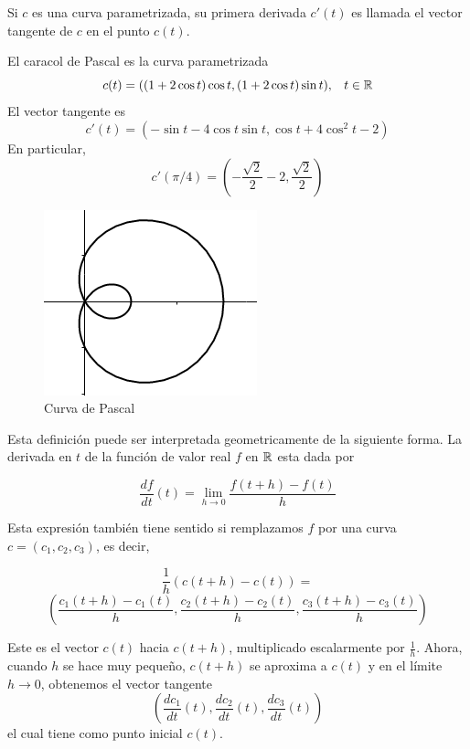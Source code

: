 \begin{definition}
    Si $c$ es una curva parametrizada, su primera derivada $c'(t)$ es llamada el vector tangente
    de $c$ en el punto $c(t)$.
\end{definition}

\begin{myExample}
    El caracol de Pascal es la curva parametrizada
    $$ c(t)=((1+2\cos{t})\cos{t},(1+2\cos{t})\sin{t})\text{,} \quad t \in \mathbb{R}$$
    El vector tangente es
    $$ c'(t)=(-\sin{t}-4\cos{t}\sin{t},\cos{t}+4\cos^{2}{t}-2)$$
    En particular,
    $$ c'(\pi/4) = (-\frac{\sqrt{2}}{2}-2,\frac{\sqrt{2}}{2})$$
\end{myExample}

\begin{figure}[!ht]
  \begin{center}
      \includegraphics[width=0.7\linewidth]{gfx/limacon2}
      \caption{Curva de Pascal}
      \label{fig:boat1}
  \end{center}
\end{figure}


Esta definición puede ser interpretada geometricamente de la siguiente forma. La derivada en
$t$ de la función de valor real $f$ en $\mathbb{R}$ esta dada por

$$ \frac{df}{dt}(t) = \lim_{h \rightarrow 0} \frac{f(t+h)-f(t)}{h} $$

Esta expresión también tiene sentido si remplazamos $f$ por una curva $c = (c_{1},c_{2},c_{3})$,
es decir,

$$ \frac{1}{h}(c(t+h)-c(t)) =$$
$$\left( \frac{c_{1}(t+h)-c_{1}(t)}{h},\frac{c_{2}(t+h)-c_{2}(t)}{h},\frac{c_{3}(t+h)-c_{3}(t)}{h} \right) $$

Este es el vector $c(t)$ hacia $c(t+h)$, multiplicado escalarmente por $\frac{1}{h}$. Ahora, cuando $h$ se hace
muy pequeño, $c(t+h)$ se aproxima a $c(t)$ y en el límite $h \rightarrow 0$, obtenemos el vector tangente
$$\left( \frac{dc_{1}}{dt}(t),\frac{dc_{2}}{dt}(t),\frac{dc_{3}}{dt}(t) \right) $$
el cual tiene como punto inicial $c(t)$.

